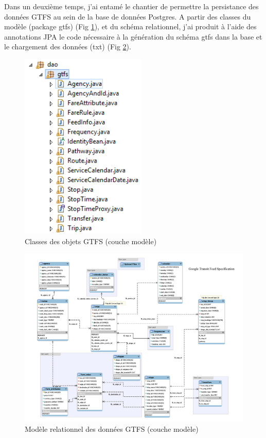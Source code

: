 \begin{itemize}
Dans un deuxième temps, j'ai entamé le \og chantier \fg de permettre la persistance des données GTFS au sein de la base de données Postgres. A partir des classes du modèle (package gtfs) (Fig \ref{packageGTFS}), et du schéma relationnel, j'ai produit à l'aide des annotations JPA le code nécessaire à la génération du schéma gtfs dans la base et le chargement des données (txt) (Fig \ref{RelationalGTFS}).\\
\begin{figure}[!h]
\centering
\includegraphics[width=6cm]{images/model_GTFS.PNG}
\caption{\label{packageGTFS}Classes des objets GTFS (couche modèle)}
\end{figure}

\begin{figure}[!h]
\centering
\includegraphics[width=14cm]{images/GTFS_Schema.png}
\caption{\label{RelationalGTFS}Modèle relationnel des données GTFS (couche modèle)}
\end{figure}



\end{itemize}
